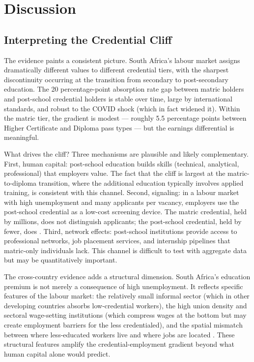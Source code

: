 \documentclass[12pt]{article}
\begin{document}
\section{Discussion}
\label{sec:discussion}

\subsection{Interpreting the Credential Cliff}

The evidence paints a consistent picture. South Africa's labour market assigns dramatically different values to different credential tiers, with the sharpest discontinuity occurring at the transition from secondary to post-secondary education. The 20 percentage-point absorption rate gap between matric holders and post-school credential holders is stable over time, large by international standards, and robust to the COVID shock (which in fact widened it). Within the matric tier, the gradient is modest --- roughly 5.5 percentage points between Higher Certificate and Diploma pass types --- but the earnings differential is meaningful.

What drives the cliff? Three mechanisms are plausible and likely complementary. First, human capital: post-school education builds skills (technical, analytical, professional) that employers value. The fact that the cliff is largest at the matric-to-diploma transition, where the additional education typically involves applied training, is consistent with this channel. Second, signaling: in a labour market with high unemployment and many applicants per vacancy, employers use the post-school credential as a low-cost screening device. The matric credential, held by millions, does not distinguish applicants; the post-school credential, held by fewer, does \citep{spence1973job}. Third, network effects: post-school institutions provide access to professional networks, job placement services, and internship pipelines that matric-only individuals lack. This channel is difficult to test with aggregate data but may be quantitatively important.

The cross-country evidence adds a structural dimension. South Africa's education premium is not merely a consequence of high unemployment. It reflects specific features of the labour market: the relatively small informal sector (which in other developing countries absorbs low-credential workers), the high union density and sectoral wage-setting institutions (which compress wages at the bottom but may create employment barriers for the less credentialed), and the spatial mismatch between where less-educated workers live and where jobs are located \citep{banerjee2008workplace, leibbrandt2010trends}. These structural features amplify the credential-employment gradient beyond what human capital alone would predict.
\end{document}
